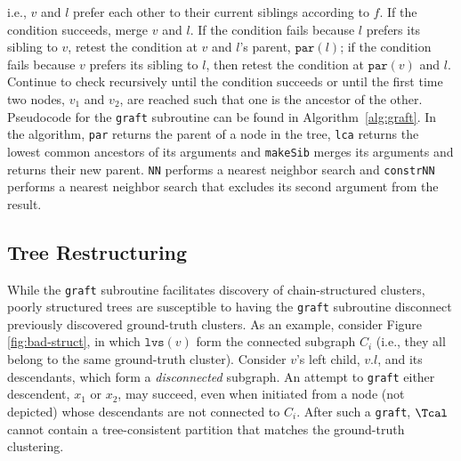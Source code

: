 \documentclass{article} \usepackage[utf8]{inputenc} \usepackage[T1]{fontenc}    \usepackage{hyperref}       \usepackage{url}            \usepackage{booktabs}       \usepackage{amsfonts}       \usepackage{nicefrac}       \usepackage{microtype}      \usepackage{geometry}
\newcommand{\graft}{\texttt{graft}\xspace}
\newcommand{\lvs}[1]{\ensuremath{\texttt{lvs}(#1)}}
\newcommand{\parent}[1]{\ensuremath{\texttt{par}}(#1)\xspace}
\begin{document}
\noindent i.e., $v$ and $l$ prefer each other to their current
siblings according to $f$. If the condition succeeds, merge $v$ and
$l$. If the condition fails because $l$ prefers its sibling to $v$,
retest the condition at $v$ and $l$'s parent, $\parent{l}$; if the
condition fails because $v$ prefers its sibling to $l$, then retest
the condition at $\parent{v}$ and $l$. Continue to check recursively
until the condition succeeds or until the first time two nodes, $v_1$
and $v_2$, are reached such that one is the ancestor of the
other. Pseudocode for the \graft subroutine can be found in
Algorithm~\ref{alg:graft}.  In the algorithm, \texttt{par} returns the
parent of a node in the tree, \texttt{lca} returns the lowest common
ancestors of its arguments and \texttt{makeSib} merges its arguments
and returns their new parent. \texttt{NN} performs a nearest neighbor
search and \texttt{constrNN} performs a nearest neighbor search that
excludes its second argument from the result.

\subsection{Tree Restructuring}
\label{subsec:restruct}
While the \graft subroutine facilitates discovery of chain-structured
clusters, poorly structured trees are susceptible to having the \graft
subroutine disconnect previously discovered ground-truth clusters.  As
an example, consider Figure \ref{fig:bad-struct}, in which $\lvs{v}$
form the connected subgraph $C_i$ (i.e., they all belong to the same
ground-truth cluster). Consider $v$'s left child, $v.l$, and its
descendants, which form a \emph{disconnected} subgraph. An attempt to
\graft either descendent, $x_1$ or $x_2$, may succeed, even when
initiated from a node (not depicted) whose descendants are not
connected to $C_i$. After such a \graft, $\Tcal$ cannot contain a
tree-consistent partition that matches the ground-truth clustering.
\end{document}
